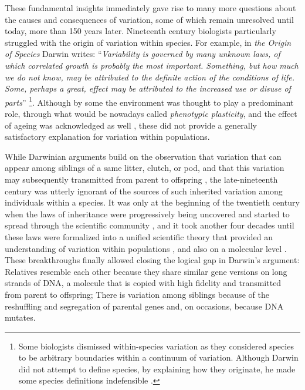These fundamental insights immediately gave rise to many more questions about the causes and consequences of variation, some of which remain unresolved until today, more than 150 years later. Nineteenth century biologists particularly struggled with the origin of variation within species. For example, in \emph{the Origin of Species} Darwin writes:  ``\emph{Variability is governed by many unknown laws, of which correlated growth is probably the most important. Something, but how much we do not know, may be attributed to the definite action of the conditions of life. Some, perhaps a great, effect may be attributed to the increased use or disuse of parts}'' \parencite[p. 31][]{Darwin1859} \footnote{Some biologists dismissed within-species variation as they considered species to be arbitrary boundaries within a continuum of variation. Although Darwin did not attempt to define species, by explaining how they originate, he made some species definitions indefensible \parencite[][pp. 129-163]{Wilkins2009}.}. Although by some the environment was thought to play a predominant role, through what would be nowadays called \emph{phenotypic plasticity}, and the effect of ageing was acknowledged as well \parencite{Wilkins2009}, these did not provide a generally satisfactory explanation for variation within populations.

While Darwinian arguments build on the observation that variation that can appear among siblings of a same litter, clutch, or pod, and that this variation may subsequently transmitted from parent to offspring \parencite[][Chapter 1]{Darwin1859}, the late-nineteenth century was utterly ignorant of the sources of such inherited variation among individuals within a species. It was only at the beginning of the twentieth century when the laws of inheritance were progressively being uncovered and started to spread through the scientific community \parencite{Dietrich2006}, and it took another four decades until these laws were formalized into a unified scientific theory that provided an understanding of variation within populations \parencite{Fisher1930}, and also on a molecular level \parencite{Oswald1943, Watson1953}. These breakthroughs finally allowed closing the logical gap in Darwin's argument: Relatives resemble each other because they share similar gene versions on long strands of DNA, a molecule that is copied with high fidelity and transmitted from parent to offspring; There is variation among siblings because of the reshuffling and segregation of parental genes and, on occasions, because DNA mutates.

